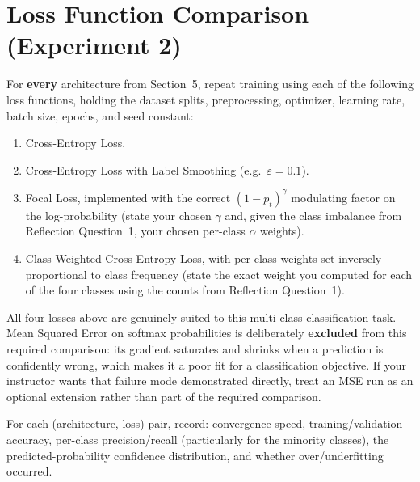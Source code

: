 \documentclass[12pt,a4paper]{article}
\begin{document}
\section{Loss Function Comparison (Experiment 2)}

For \textbf{every} architecture from Section~5, repeat training using each of the
following loss functions, holding the dataset splits, preprocessing, optimizer,
learning rate, batch size, epochs, and seed constant:

\begin{enumerate}[leftmargin=*, label=\arabic*.]
  \item Cross-Entropy Loss.
  \item Cross-Entropy Loss with Label Smoothing (e.g.\ $\varepsilon = 0.1$).
  \item Focal Loss, implemented with the correct $(1-p_t)^{\gamma}$ modulating factor
        on the log-probability (state your chosen $\gamma$ and, given the class
        imbalance from Reflection Question~1, your chosen per-class $\alpha$ weights).
  \item Class-Weighted Cross-Entropy Loss, with per-class weights set inversely
        proportional to class frequency (state the exact weight you computed for each
        of the four classes using the counts from Reflection Question~1).
\end{enumerate}

\begin{notebox}
All four losses above are genuinely suited to this multi-class classification task.
Mean Squared Error on softmax probabilities is deliberately \textbf{excluded} from this
required comparison: its gradient saturates and shrinks when a prediction is
confidently wrong, which makes it a poor fit for a classification objective. If your
instructor wants that failure mode demonstrated directly, treat an MSE run as an
optional extension rather than part of the required comparison.
\end{notebox}

\begin{stepbox}
For each (architecture, loss) pair, record: convergence speed, training/validation
accuracy, per-class precision/recall (particularly for the minority classes), the
predicted-probability confidence distribution, and whether over/underfitting occurred.
\end{stepbox}
\end{document}

